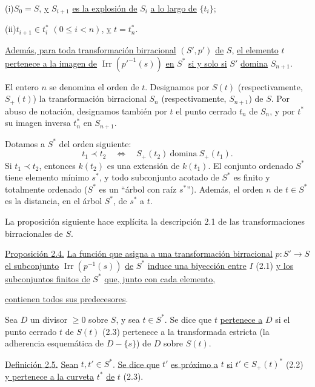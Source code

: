 \medskip
\noindent (i)\quad $S_0=S$, \underline{y} $S_{i+1}$ \underline{es la explosión
de} $S_i$ \underline{a lo largo de} $\{t_i\}$;

\noindent (ii)\quad $t_{i+1}\in t_i^*$ $(0\leq i<n)$, \underline{y}
$t=t_n^*$.

\medskip
\noindent\underline{Además, para toda transformación birracional} $(S',p')$
\underline{de} $S$, \underline{el elemento} $t$ \underline{pertenece a la
imagen de} $\operatorname{Irr}(p'^{-1}(s))$ \underline{en} $S^*$
\underline{si y solo si} $S'$ \underline{domina} $S_{n+1}$.

El entero $n$ se denomina el orden de $t$. Designamos por $S(t)$
(respectivamente, $S_+(t)$) la transformación birracional $S_n$
(respectivamente, $S_{n+1}$) de $S$. Por abuso de notación, designamos también
por $t$ el punto cerrado $t_n$ de $S_n$, y por $t^*$ su imagen inversa $t_n^*$
en $S_{n+1}$.

Dotamos a $S^*$ del orden siguiente:
\begin{equation*}
t_1\prec t_2
\quad\Longleftrightarrow\quad
S_+(t_2)\ \text{domina}\ S_+(t_1).
\end{equation*}
Si $t_1\prec t_2$, entonces $k(t_2)$ es una extensión de $k(t_1)$. El conjunto
ordenado $S^*$ tiene elemento mínimo $s^*$, y todo subconjunto acotado de $S^*$
es finito y totalmente ordenado ($S^*$ es un ``árbol con raíz $s^*$''). Además,
el orden $n$ de $t\in S^*$ es la distancia, en el árbol $S^*$, de $s^*$ a $t$.

La proposición siguiente hace explícita la descripción 2.1 de las
transformaciones birracionales de $S$.

\medskip
\noindent\underline{Proposición 2.4.}
\underline{La función que asigna a una transformación birracional}
$p:S'\to S$ \underline{el subconjunto} $\operatorname{Irr}(p^{-1}(s))$
\underline{de} $S^*$ \underline{induce una biyección entre} $I$ (2.1)
\underline{y los subconjuntos finitos de} $S^*$ \underline{que, junto con cada
elemento,}

\pageoriginale

\underline{contienen todos sus predecesores}.

Sea $D$ un divisor $\geq0$ sobre $S$, y sea $t\in S^*$. Se dice que $t$
\underline{pertenece a} $D$ si el punto cerrado $t$ de $S(t)$ (2.3) pertenece a
la transformada estricta (la adherencia esquemática de $D-\{s\}$) de $D$ sobre
$S(t)$.

\medskip
\noindent\underline{Definición 2.5.}
\underline{Sean} $t,t'\in S^*$. \underline{Se dice que} $t'$ \underline{es
próximo a} $t$ \underline{si} $t'\in S_+(t)^*$ (2.2) \underline{y pertenece a
la curveta} $t^*$ \underline{de} $t$ (2.3).

